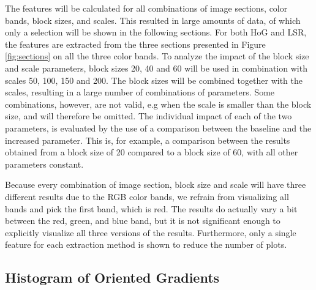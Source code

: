 The features will be calculated for all combinations of image sections, color
bands, block sizes, and scales. This resulted in large amounts of data, of
which only a selection will be shown in the following sections. For both HoG
and LSR, the features are extracted from the three sections presented in Figure
\ref{fig:sections} on all the three color bands. To analyze the impact of the
block size and scale parameters, block sizes 20, 40 and 60 will be used in
combination with scales 50, 100, 150 and 200. The block sizes will be combined
together with the scales, resulting in a large number of combinations of
parameters.  Some combinations, however, are not valid, e.g when the scale is
smaller than the block size, and will therefore be omitted. The individual
impact of each of the two parameters, is evaluated by the use of a comparison
between the baseline and the increased parameter. This is, for example,
a comparison between the results obtained from a block size of 20 compared to
a block size of 60, with all other parameters constant. 

Because every combination of image section, block size and scale will have
three different results due to the RGB color bands, we refrain from visualizing
all bands and pick the first band, which is red. The results do actually vary
a bit between the red, green, and blue band, but it is not significant enough
to explicitly visualize all three versions of the results. Furthermore, only
a single feature for each extraction method is shown to reduce the number of
plots.

\subsection{Histogram of Oriented Gradients}

